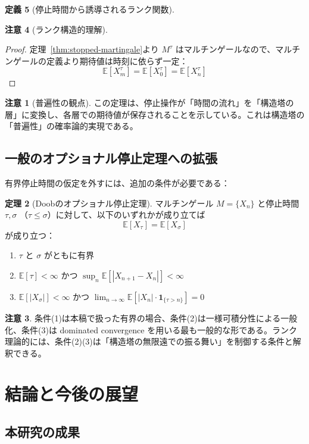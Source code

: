 \documentclass[a4paper,11pt]{ltjsarticle}
\theoremstyle{definition}
\newtheorem{theorem}{定理}[section]
\newtheorem{definition}[theorem]{定義}
\newtheorem{remark}[theorem]{注意}
\newcommand{\E}{\mathbb{E}}
\begin{document}
\begin{definition}[停止時間から誘導されるランク関数]
\begin{remark}[ランク構造的理解]
\begin{proof}
定理~\ref{thm:stopped-martingale}より $M^\tau$ はマルチンゲールなので、マルチンゲールの定義より期待値は時刻に依らず一定：
\[
\E[X_m^\tau] = \E[X_0^\tau] = \E[X_n^\tau]
\]
\end{proof}

\begin{remark}[普遍性の観点]
この定理は、停止操作が「時間の流れ」を「構造塔の層」に変換し、各層での期待値が保存されることを示している。これは構造塔の「普遍性」の確率論的実現である。
\end{remark}

\subsection{一般のオプショナル停止定理への拡張}

有界停止時間の仮定を外すには、追加の条件が必要である：

\begin{theorem}[Doobのオプショナル停止定理]\label{thm:doob-ost}
マルチンゲール $M = \{X_n\}$ と停止時間 $\tau, \sigma$ （$\tau \leq \sigma$）に対して、以下のいずれかが成り立てば
\[
\E[X_\tau] = \E[X_\sigma]
\]
が成り立つ：
\begin{enumerate}[label=(\arabic*)]
\item $\tau$ と $\sigma$ がともに有界
\item $\E[\tau] < \infty$ かつ $\sup_n \E[|X_{n+1} - X_n|] < \infty$
\item $\E[|X_\sigma|] < \infty$ かつ $\lim_{n \to \infty} \E[|X_n| \cdot \mathbf{1}_{\{\tau > n\}}] = 0$
\end{enumerate}
\end{theorem}

\begin{remark}
条件(1)は本稿で扱った有界の場合、条件(2)は一様可積分性による一般化、条件(3)は dominated convergence を用いる最も一般的な形である。ランク理論的には、条件(2)(3)は「構造塔の無限遠での振る舞い」を制御する条件と解釈できる。
\end{remark}

\section{結論と今後の展望}

\subsection{本研究の成果}


\end{remark}
\end{definition}
\end{document}
